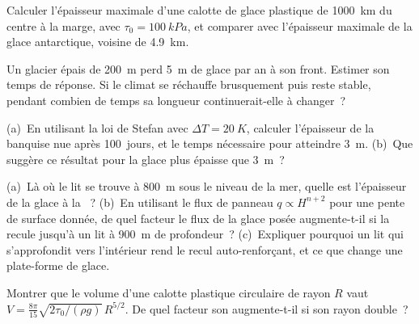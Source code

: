 \begin{exercise}[$\star\star$]\label{exo:b3:glaciology:7}
Calculer l'épaisseur maximale d'une calotte de glace plastique de \qty{1000}{km} du
centre à la marge, avec $\tau_0 = \qty{100}{kPa}$, et comparer avec l'épaisseur
maximale de la glace antarctique, voisine de \qty{4.9}{km}.
\end{exercise}

\begin{exercise}[$\star\star$]\label{exo:b3:glaciology:8}
Un glacier épais de \qty{200}{m} perd \qty{5}{m} de glace par an à son front.
Estimer son temps de réponse. Si le climat se réchauffe brusquement puis reste
stable, pendant combien de temps sa longueur continuerait-elle à changer~?
\end{exercise}

\begin{exercise}[$\star\star$]\label{exo:b3:glaciology:9}
(a)~En utilisant la loi de Stefan avec $\Delta T = \qty{20}{K}$, calculer l'épaisseur
de la banquise nue après \num{100}~jours, et le temps nécessaire pour atteindre \qty{3}{m}.
(b)~Que suggère ce résultat pour la glace plus épaisse que \qty{3}{m}~?
\end{exercise}

\begin{exercise}[$\star\star\star$]\label{exo:b3:glaciology:10}
(a)~Là où le lit se trouve à \qty{800}{m} sous le niveau de la mer, quelle est
l'épaisseur de la glace à la ~? (b)~En utilisant le flux de panneau
$q \propto H^{n+2}$ pour une pente de surface donnée, de quel facteur le flux de la
glace posée augmente-t-il si la  recule jusqu'à un lit à \qty{900}{m} de profondeur~? (c)~Expliquer
pourquoi un lit qui s'approfondit vers l'intérieur rend le recul auto-renforçant, et ce que
change une plate-forme de glace.
\end{exercise}

\begin{exercise}[$\star\star\star$]\label{exo:b3:glaciology:11}
Montrer que le volume d'une calotte plastique circulaire de rayon $R$ vaut $V =
\frac{8\pi}{15}\sqrt{2\tau_0/(\rho g)}\,R^{5/2}$. De quel facteur son  augmente-t-il si son rayon double~?
\end{exercise}

